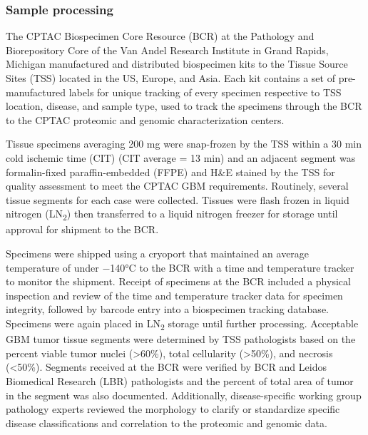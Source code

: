 \subsubsection{Sample processing}
The CPTAC Biospecimen Core Resource (BCR) at the Pathology and Biorepository Core of the Van Andel Research Institute in Grand Rapids, Michigan manufactured and distributed biospecimen kits to the Tissue Source Sites (TSS) located in the US, Europe, and Asia. Each kit contains a set of pre-manufactured labels for unique tracking of every specimen respective to TSS location, disease, and sample type, used to track the specimens through the BCR to the CPTAC proteomic and genomic characterization centers.

Tissue specimens averaging 200 mg were snap-frozen by the TSS within a 30 min cold ischemic time (CIT) (CIT average = 13 min) and an adjacent segment was formalin-fixed paraffin-embedded (FFPE) and H\&E stained by the TSS for quality assessment to meet the CPTAC GBM requirements. Routinely, several tissue segments for each case were collected. Tissues were flash frozen in liquid nitrogen (LN\textsubscript{2}) then transferred to a liquid nitrogen freezer for storage until approval for shipment to the BCR.

Specimens were shipped using a cryoport that maintained an average temperature of under −140°C to the BCR with a time and temperature tracker to monitor the shipment. Receipt of specimens at the BCR included a physical inspection and review of the time and temperature tracker data for specimen integrity, followed by barcode entry into a biospecimen tracking database. Specimens were again placed in LN\textsubscript{2} storage until further processing. Acceptable GBM tumor tissue segments were determined by TSS pathologists based on the percent viable tumor nuclei (>60\%), total cellularity (>50\%), and necrosis (<50\%). Segments received at the BCR were verified by BCR and Leidos Biomedical Research (LBR) pathologists and the percent of total area of tumor in the segment was also documented. Additionally, disease-specific working group pathology experts reviewed the morphology to clarify or standardize specific disease classifications and correlation to the proteomic and genomic data.

